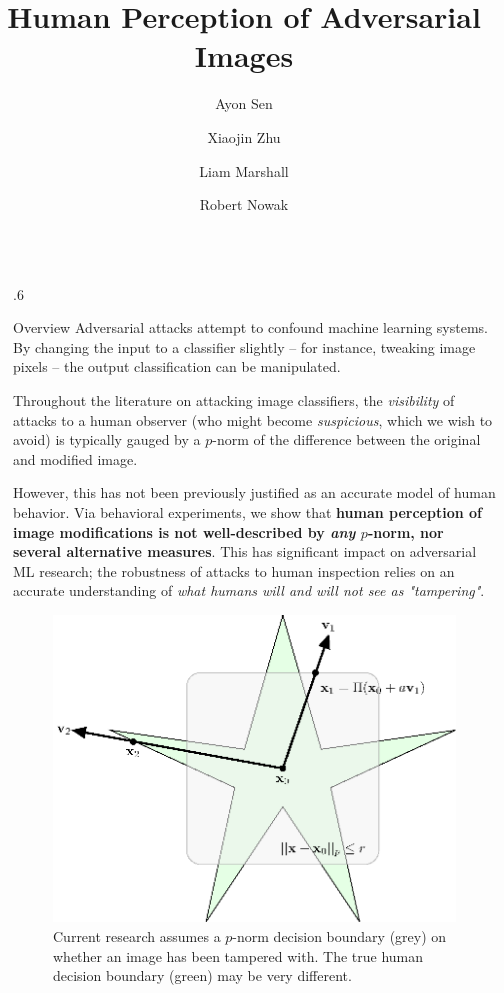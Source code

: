 \documentclass[final,notheorems]{beamer}
\title{Human Perception of Adversarial Images}
\author{Ayon Sen \inst{1} \and Xiaojin Zhu \inst{1} \and Liam Marshall \inst{1} \and Robert Nowak \inst{1}}
\institute[shortinst]{\inst{1} University of Wisconsin-Madison}
\newlength{\sepwidth}
\newlength{\colwidth}
\newcommand{\separatorcolumn}{\begin{column}{\sepwidth}\end{column}}
\begin{document}
\begin{frame}[t]
\begin{columns}[t]
\separatorcolumn

\begin{column}{.6\colwidth}
  \begin{block}{Overview}
    Adversarial attacks attempt to confound machine learning systems. By changing the input to a classifier slightly -- for instance, tweaking image pixels -- the output classification can be manipulated.

    Throughout the literature on attacking image classifiers, the \emph{visibility} of attacks to a human observer (who might become \emph{suspicious}, which we wish to avoid) is typically gauged by a $p$-norm of the difference between the original and modified image.

    However, this has not been previously justified as an accurate model of human behavior.
    Via behavioral experiments, we show\cite{sen2019perception} that \textbf{human perception of image modifications is not well-described by \emph{any} $p$-norm, nor several alternative measures}.
    This has significant impact on adversarial ML research; the robustness of attacks to human inspection relies on an accurate understanding of \emph{what humans will and will not see as "tampering"}.

    \begin{figure}
      \includegraphics[width=.8\linewidth]{fig/intro_image-figure0.eps}
      \caption{Current research assumes a $p$-norm decision boundary (grey) on whether an image has been tampered with. The true human decision boundary (green) may be very different.}
      \label{fig:decision_boundary}
    \end{figure}
  \end{block}


\end{column}
\end{columns}
\end{frame}
\end{document}
